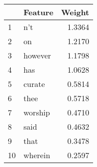 \begin{tabular}{llr}
\toprule
{} &  Feature &  Weight \\
\midrule
1  &      n't &  1.3364 \\
2  &       on &  1.2170 \\
3  &  however &  1.1798 \\
4  &      has &  1.0628 \\
5  &   curate &  0.5814 \\
6  &     thee &  0.5718 \\
7  &  worship &  0.4710 \\
8  &     said &  0.4632 \\
9  &     that &  0.3478 \\
10 &  wherein &  0.2597 \\
\bottomrule
\end{tabular}
